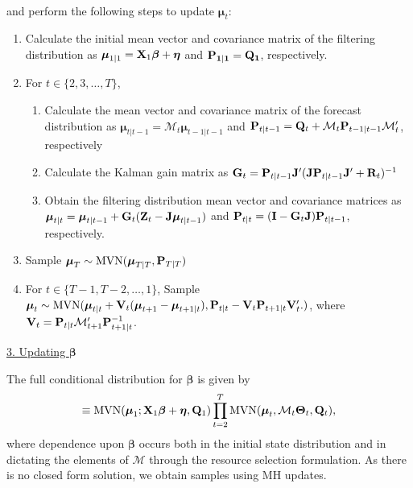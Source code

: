 \documentclass[12pt,fleqn]{article}
\begin{document}
\begin{flushleft}
\begin{eqnarray*}
\end{eqnarray*}
and perform the following steps to update $\boldsymbol{\mu}_t$:
\begin{enumerate}
  \item Calculate the initial mean vector and covariance matrix of the filtering distribution as
  $\boldsymbol{\mu}_{1|1} = {\bf X}_1 \boldsymbol{\beta} + \boldsymbol{\eta} $ and $\bf{P}_{1|1} = \bf{Q}_1$, respectively.
  \item For $t \in \{ 2,3, \hdots,T \}$,
    \begin{enumerate}
      \item Calculate the mean vector and covariance matrix of the forecast distribution as
        $\boldsymbol{\mu}_{t|t-1} = \mathcal{M}_t \boldsymbol{\mu}_{t-1|t-1}$ and ${\bf P}_{t|t-1} = {\bf Q}_t + \mathcal{M}_t {\bf P}_{t-1|t-1} \mathcal{M}_t^\prime$, respectively
      \item Calculate the Kalman gain matrix as ${\bf G}_t={\bf P}_{t|t-1}{\bf J}^\prime({\bf J}{\bf P}_{t|t-1}{\bf J}^\prime+{\bf R}_t)^{-1}$
      \item Obtain the filtering distribution mean vector and covariance matrices as $\boldsymbol{\mu}_{t|t} = \boldsymbol{\mu}_{t|t-1} + {\bf G}_t({\bf Z}_t-{\bf J}\boldsymbol{\mu}_{t|t-1})$ and ${\bf P}_{t|t} = ({\bf I}-{\bf G}_t {\bf J}){\bf P}_{t|t-1}$, respectively.
    \end{enumerate}
  \item Sample $\boldsymbol{\mu}_T \sim \textrm{MVN}(\boldsymbol{\mu}_{T|T},{\bf P}_{T|T})$
  \item For $t \in \{ T-1, T-2, \hdots, 1 \}$, Sample $\boldsymbol{\mu}_t \sim \textrm{MVN}(\boldsymbol{\mu}_{t|t} + {\bf V}_t (\boldsymbol{\mu}_{t+1}-\boldsymbol{\mu}_{t+1|t}),{\bf P}_{t|t}-{\bf V}_t {\bf P}_{t+1|t} {\bf V}_t^\prime.)$, where ${\bf V}_t = {\bf P}_{t|t} \mathcal{M}_{t+1}^\prime {\bf P}_{t+1|t}^{-1}$.
\end{enumerate}


\underline{3. Updating $\boldsymbol{\beta}$}

\hspace{.5in}The full conditional distribution for $\boldsymbol{\beta}$ is given by
\begin{eqnarray*}
  [\boldsymbol{\beta} | \cdot] \equiv \textrm{MVN}(\boldsymbol{\mu}_1; {\bf X}_1 \boldsymbol{\beta} + \boldsymbol{\eta},{\bf Q}_1) \prod_{t=2}^T \textrm{MVN}(\boldsymbol{\mu}_t, \mathcal{M}_t \boldsymbol{\Theta}_t,{\bf Q}_t),
\end{eqnarray*}
where dependence upon $\boldsymbol{\beta}$ occurs both in the initial state distribution and in dictating the elements of $\mathcal{M}$ through the resource selection formulation.  As there is no closed form solution, we
obtain samples using MH updates.


\end{flushleft}
\end{document}

